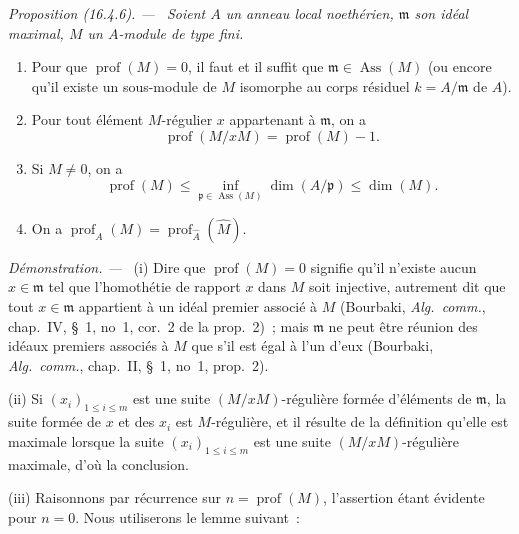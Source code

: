 \documentclass[10pt,oneside]{book}
\makeatletter
\newcommand{\setmanualcurrentlabel}[1]{\def\@currentlabel{#1}}
\newcommand{\oldpage}[2][]{%
  \setcounter{footnote}{0}%
  \marginpar{\scriptsize\textbf{#1}~|~#2}\ignorespaces}
\newenvironment{proposition}[1][]{%
  \setmanualcurrentlabel{#1}\par\medskip\noindent\itshape Proposition (#1). ---\ }{\par}
\newenvironment{proof}{%
  \par\medskip\noindent\textit{Démonstration. ---\ }}{\par}
\newcommand{\EGAReaderTarget}[2]{\hypertarget{#1}{}\@bsphack\begingroup\def\@currentHref{#1}\label{#2}\endgroup\@esphack}
\makeatother
\begin{document}
\begin{proposition}[16.4.6]
\EGAReaderTarget{canon-ref.0.16.4.6-fr}{0.16.4.6-fr}
Soient $A$ un anneau local noethérien, $\mathfrak{m}$ son idéal maximal, $M$ un
$A$-module de type fini.
\begin{enumerate}
  \item[\rm{(i)}] Pour que $\operatorname{prof}(M)=0$, il faut et il suffit que
  $\mathfrak{m}\in\operatorname{Ass}(M)$ (ou encore qu'il existe un sous-module
  de $M$ isomorphe au corps résiduel $k=A/\mathfrak{m}$ de $A$).
  \item[\rm{(ii)}] Pour tout élément $M$-régulier $x$ appartenant à
  $\mathfrak{m}$, on a
  \begin{equation}
  \label{0.16.4.6.1-fr}
  \tag{16.4.6.1}
    \operatorname{prof}(M/xM)=\operatorname{prof}(M)-1.
  \end{equation}
  \item[\rm{(iii)}] Si $M\neq0$, on a
  \begin{equation}
  \label{0.16.4.6.2-fr}
  \tag{16.4.6.2}
    \operatorname{prof}(M)
    \leq\inf_{\mathfrak{p}\in\operatorname{Ass}(M)}\dim(A/\mathfrak{p})
    \leq\dim(M).
  \end{equation}
  \oldpage[0\textsubscript{IV-1}]{34}
  \item[\rm{(iv)}] On a
  $\operatorname{prof}_A(M)=
  \operatorname{prof}_{\widehat{A}}(\widehat{M})$.
\end{enumerate}
\end{proposition}

\begin{proof}
(i) Dire que $\operatorname{prof}(M)=0$ signifie qu'il n'existe aucun
$x\in\mathfrak{m}$ tel que l'homothétie de rapport $x$ dans $M$ soit
injective, autrement dit que tout $x\in\mathfrak{m}$ appartient à un idéal
premier associé à $M$ (Bourbaki, \emph{Alg.~comm.}, chap.~IV, \S~1, no~1,
cor.~2 de la prop.~2)~; mais $\mathfrak{m}$ ne peut être réunion des idéaux
premiers associés à $M$ que s'il est égal à l'un d'eux (Bourbaki,
\emph{Alg.~comm.}, chap.~II, \S~1, no~1, prop.~2).

(ii) Si $(x_i)_{1\leq i\leq m}$ est une suite $(M/xM)$-régulière formée
d'éléments de $\mathfrak{m}$, la suite formée de $x$ et des $x_i$ est
$M$-régulière, et il résulte de la définition qu'elle est maximale lorsque la
suite $(x_i)_{1\leq i\leq m}$ est une suite $(M/xM)$-régulière maximale, d'où
la conclusion.

(iii) Raisonnons par récurrence sur $n=\operatorname{prof}(M)$, l'assertion
étant évidente pour $n=0$. Nous utiliserons le lemme suivant~:
\end{proof}
\end{document}
